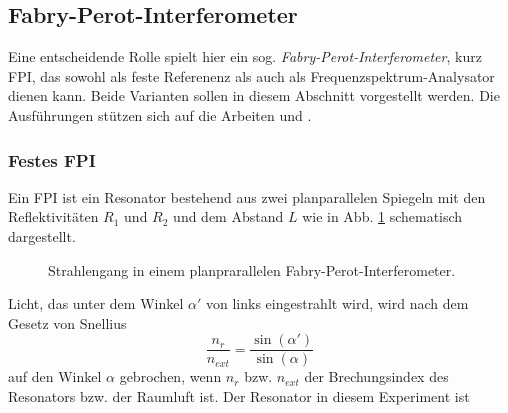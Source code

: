 \subsection{Fabry-Perot-Interferometer}
Eine entscheidende Rolle spielt hier ein sog.
\textit{Fabry-Perot-Interferometer}, kurz FPI, das sowohl
als feste Referenenz als auch als Frequenzspektrum-Analysator dienen kann.
Beide Varianten sollen in diesem Abschnitt vorgestellt werden. Die Ausführungen
stützen sich auf die Arbeiten \cite{wiche:1997:diplomarbeit} und
\cite{kuschnick:2000:diplomarbeit}.

\subsubsection{Festes FPI}\label{subsubsec:festes_FPI}
Ein FPI ist ein Resonator bestehend aus zwei planparallelen Spiegeln mit den
Reflektivitäten $R_1$ und $R_2$ und dem Abstand $L$ wie in Abb.
\ref{fig:FPI_planparallel} schematisch dargestellt.
\begin{figure}[h]
 	\centering
	\caption[FPI - planparallel]{Strahlengang in einem
	planprarallelen Fabry-Perot-Interferometer.}\label{fig:FPI_planparallel}
\end{figure}
Licht, das unter dem Winkel
$\alpha'$ von links eingestrahlt wird, wird nach dem Gesetz von Snellius
\begin{equation}\label{eq:snellius}
	\frac{n_r}{n_{ext}}=\frac{\sin{(\alpha')}}{\sin{(\alpha)}}
\end{equation}
auf den Winkel $\alpha$ gebrochen, wenn $n_r$ bzw. $n_{ext}$ der Brechungsindex
des Resonators bzw. der Raumluft ist. Der Resonator in diesem Experiment ist
